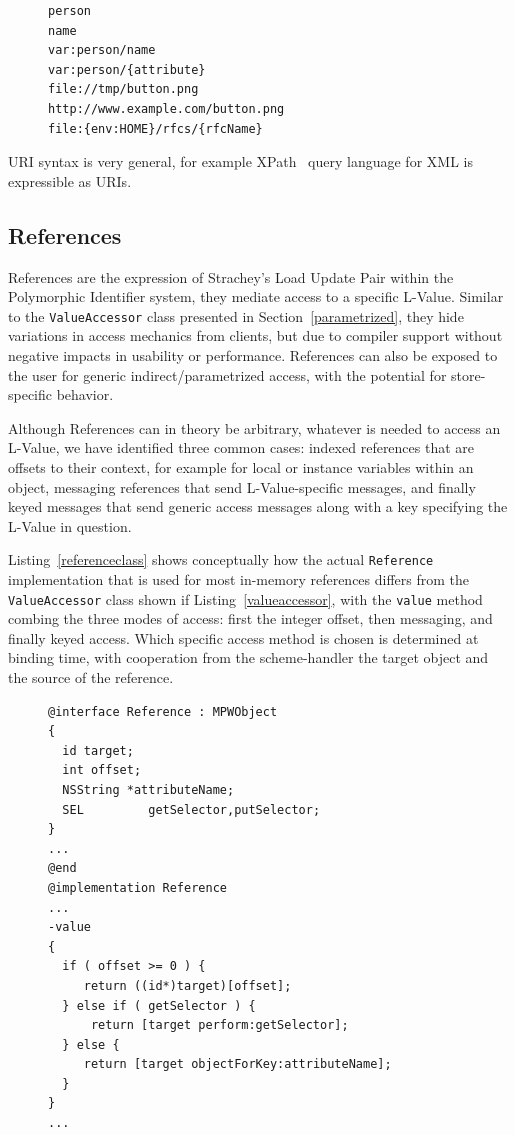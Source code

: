 \documentclass[preprint]{sigplanconf}
\begin{document}
\begin{figure}[htbp]
\begin{lstlisting}[style=numbers,label=validpis,caption=Valid Polymorphic Identifiers]
person
name
var:person/name
var:person/{attribute}
file://tmp/button.png
http://www.example.com/button.png
file:{env:HOME}/rfcs/{rfcName} 
\end{lstlisting}
\end{figure}

URI syntax is very general, for example XPath~\cite{path} query language for XML is 
expressible as URIs.

\subsection{References}

References are the expression of Strachey's Load Update Pair within the Polymorphic
Identifier system, they mediate access to a specific L-Value.  Similar to the {\tt ValueAccessor}
class presented in Section~\ref{parametrized}, they hide variations in access mechanics from
clients, but due to compiler support without negative impacts in usability or performance. 
References can also be exposed to the user for generic indirect/parametrized access, with
the potential for store-specific behavior.

Although References can in theory be arbitrary, whatever is needed to access an L-Value,
we have identified three common cases:   indexed references that are offsets to their
context, for example for local or instance variables within an object, messaging references
that send L-Value-specific messages, and finally keyed messages that send generic
access messages along with a key specifying the L-Value in question.

Listing~\ref{referenceclass} shows conceptually how the actual {\tt Reference} implementation
that is used for most in-memory references 
differs from the {\tt ValueAccessor} class shown if Listing~\ref{valueaccessor}, with the
{\tt value} method combing the three modes of access:  first the integer offset, then messaging, and
finally keyed access.  Which specific access method is chosen is determined at binding time,
with cooperation from the scheme-handler the target object and the source of the reference.


\begin{figure}[htbp]
\begin{lstlisting}[style=numbers,label=referenceclass,caption=Reference class extract]
@interface Reference : MPWObject
{
  id target;
  int offset;
  NSString *attributeName;
  SEL         getSelector,putSelector;
}
...
@end
@implementation Reference
...
-value
{
  if ( offset >= 0 ) {
     return ((id*)target)[offset];
  } else if ( getSelector ) {
      return [target perform:getSelector];
  } else {
     return [target objectForKey:attributeName];
  }
}
...
\end{lstlisting}
\end{figure}
\end{document}
